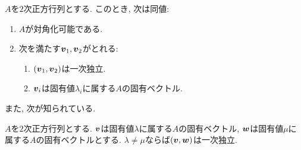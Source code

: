 \begin{theorem}
  \label{thm:diagonizablity}
  $A$を$2$次正方行列とする.
  このとき, 次は同値:
  \begin{enumerate}
  \item\label{thm:diagonizablity:item:diagonalizable}
    $A$が対角化可能である.
  \item\label{thm:diagonizablity:item:eigen}
    次を満たす$\boldsymbol{v}_1,\boldsymbol{v}_2$がとれる:
    \begin{enumerate}
      \item $(\boldsymbol{v}_1,\boldsymbol{v}_2)$は一次独立.
      \item $\boldsymbol{v}_i$は固有値$\lambda_i$に属する$A$の固有ベクトル.
    \end{enumerate}
  \end{enumerate}
\end{theorem}
また, 次が知られている.
\begin{theorem}
  \label{thm:diferenteigen:linindep}
  $A$を$2$次正方行列とする.
  $\boldsymbol{v}$は固有値$\lambda$に属する$A$の固有ベクトル,
  $\boldsymbol{w}$は固有値$\mu$に属する$A$の固有ベクトルとする.
  $\lambda\neq\mu$ならば$(\boldsymbol{v},\boldsymbol{w})$は一次独立.
\end{theorem}

